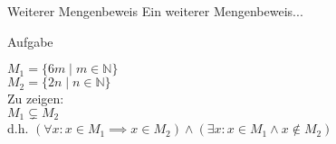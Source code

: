 %
%
%
%

\begin{frame}{Weiterer Mengenbeweis}
    Ein weiterer Mengenbeweis...
    \begin{block}{\alert{Aufgabe}}

        $M_1=\{6m \mid m \in \mathbb{N}\}$\\
        $M_2=\{2n \mid n \in \mathbb{N}\}$\\
        Zu zeigen:\\
        $M_1 \subsetneq M_2$\\
        d.h. $(\forall x: x \in M_1 \implies x \in M_2) \wedge (\exists x: x \in M_1 \land x \notin M_2)$




    \end{block}

\end{frame}

